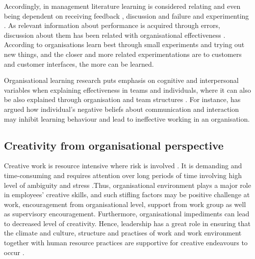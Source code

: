 Accordingly, in management literature learning is considered relating and even being dependent on receiving feedback \citep{schon1983reflective}, discussion and failure \citep{sitkin1992learning} and experimenting \citep{henderson1990architectural}. As relevant information about performance is acquired through errors, discussion about them has been related with organisational effectiveness \citep{sitkin1992learning}. According to \citet{huy2003rhythm} organisations learn best through small experiments and trying out new things, and the closer and more related experimentations are to customers and customer interfaces, the more can be learned. 

Organisational learning research puts emphasis on cognitive and interpersonal variables when explaining effectiveness in teams and individuals, where it can also be also explained through organisation and team structures \citep{edmondson1999psychological}. For instance, \citet{argyris1993knowledge} has argued how individual's negative beliefs about communication and interaction may inhibit learning behaviour and lead to ineffective working in an organisation. 

\subsection{Creativity from organisational perspective}
Creative work is resource intensive where risk is involved \citep{mumford2002leading}. It is demanding and time-consuming\citep{mumford2002leading} and requires attention over long periods of time involving high level of ambiguity and stress \citep{kasof1997creativity}.Thus, organisational environment plays a major role in employees' creative skills, and such stifling factors may be positive challenge at work, encouragement from organisational level, support from work group as well as supervisory encouragement. Furthermore, organisational impediments can lead to decreased level of creativity. \citep{amabile1998kill} Hence, leadership has a great role in ensuring that the climate and culture, structure and practises of work and work environment together with human resource practices are supportive for creative endeavours to occur \citep{shalley2004leaders,oldham1996employee,mumford2002leading}.

